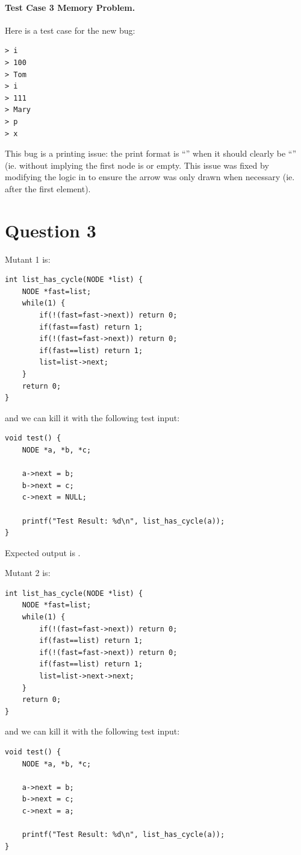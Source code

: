 \documentclass[12pt]{article}
\begin{document}
\paragraph{Test Case 3 Memory Problem.} Here is a test case for the new bug:
\begin{verbatim}
> i
> 100
> Tom
> i
> 111
> Mary
> p
> x
\end{verbatim}
This bug is a printing issue: the print format is ``\rmfamily{}'' when it should clearly be ``\rmfamily{}'' (ie. without implying the first node is \rmfamily{} or empty. This issue was fixed by modifying the logic in \rmfamily{} to ensure the arrow was only drawn when necessary (ie. after the first element).

\section*{Question 3}
Mutant 1 is:
\begin{verbatim}
int list_has_cycle(NODE *list) {
    NODE *fast=list;
    while(1) {
        if(!(fast=fast->next)) return 0;
        if(fast==fast) return 1;
        if(!(fast=fast->next)) return 0;
        if(fast==list) return 1;
        list=list->next;
    }
    return 0;
}
\end{verbatim}
and we can kill it with the following test input:
\begin{verbatim}
void test() {
    NODE *a, *b, *c;

    a->next = b;
    b->next = c;
    c->next = NULL;

    printf("Test Result: %d\n", list_has_cycle(a));
}
\end{verbatim}

Expected output is \rmfamily{}.

Mutant 2 is:
\begin{verbatim}
int list_has_cycle(NODE *list) {
    NODE *fast=list;
    while(1) {
        if(!(fast=fast->next)) return 0;
        if(fast==list) return 1;
        if(!(fast=fast->next)) return 0;
        if(fast==list) return 1;
        list=list->next->next;
    }
    return 0;
}
\end{verbatim}
and we can kill it with the following test input:
\begin{verbatim}
void test() {
    NODE *a, *b, *c;

    a->next = b;
    b->next = c;
    c->next = a;

    printf("Test Result: %d\n", list_has_cycle(a));
}
\end{verbatim}
\end{document}
